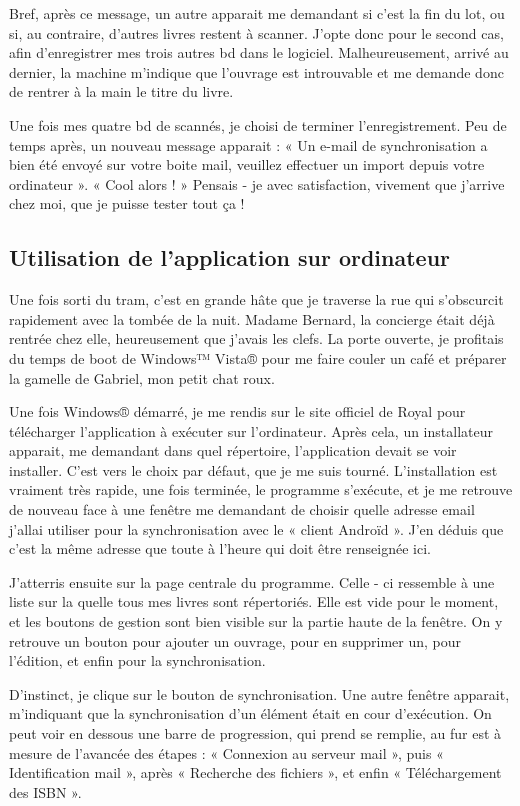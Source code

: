 Bref, après ce message, un autre apparait me demandant si c'est la fin du lot, ou si, au contraire, d'autres livres restent à scanner. 
J'opte donc pour le second cas, afin d'enregistrer mes trois autres bd dans le logiciel. 
Malheureusement, arrivé au dernier, la machine m'indique que l'ouvrage est introuvable et me demande donc de rentrer à la main le titre du livre. 

Une fois mes quatre bd de scannés, je choisi de terminer l'enregistrement. 
Peu de temps après, un nouveau message apparait : « Un e-mail de synchronisation a bien été envoyé sur votre boite mail, veuillez effectuer un import depuis votre ordinateur ».
« Cool alors ! » Pensais - je avec satisfaction, vivement que j'arrive chez moi, que je puisse tester tout ça !


\subsection{Utilisation de l'application sur ordinateur}
Une fois sorti du tram, c'est en grande hâte que je traverse la rue qui s'obscurcit rapidement avec la tombée de la nuit. 
Madame Bernard, la concierge était déjà rentrée chez elle, heureusement que j'avais les clefs. 
La porte ouverte, je profitais du temps de boot de Windows™ Vista® pour me faire couler un café et préparer la gamelle de Gabriel, mon petit chat roux.

Une fois Windows® démarré, je me rendis sur le site officiel de Royal pour télécharger l'application à exécuter sur l'ordinateur. 
Après cela, un installateur apparait, me demandant dans quel répertoire, l'application devait se voir installer. 
C'est vers le choix par défaut, que je me suis tourné. 
L'installation est vraiment très rapide, une fois terminée, le programme s'exécute, et je me retrouve de nouveau face à une fenêtre me demandant de choisir quelle adresse email j'allai utiliser pour la synchronisation avec le « client Androïd ». 
J'en déduis que c'est la même adresse que toute à l'heure qui doit être renseignée ici.

J'atterris ensuite sur la page centrale du programme. 
Celle - ci ressemble à une liste sur la quelle tous mes livres sont répertoriés. 
Elle est vide pour le moment, et les boutons de gestion sont bien visible sur la partie haute de la fenêtre. 
On y retrouve un bouton pour ajouter un ouvrage, pour en supprimer un, pour l'édition, et enfin pour la synchronisation. 

D'instinct, je clique sur le bouton de synchronisation.
Une autre fenêtre apparait, m'indiquant que la synchronisation d'un élément était en cour d'exécution. 
On peut voir en dessous une barre de progression, qui prend se remplie, au fur est à mesure de l'avancée des étapes : 
« Connexion au serveur mail », puis « Identification mail », après « Recherche des fichiers », et enfin « Téléchargement des ISBN ».

